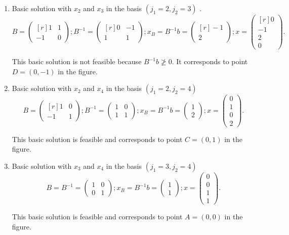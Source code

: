 \begin{enumerate}
This basic solution is feasible and corresponds to point $B=(1,0)$ .

\item Basic solution with $x_2$ and $x_3$ in the basis $(j_1=2,j_2=3)$ .
\[
B =
\begin{pmatrix*}[r]
1 & 1\\
-1 &0
\end{pmatrix*};
B^{-1} =
\begin{pmatrix*}[r]
0 & -1\\
1 & 1
\end{pmatrix*};
x_B = B^{-1}b =
\begin{pmatrix*}[r]
-1 \\
2
\end{pmatrix*};
x =
\begin{pmatrix*}[r]
0 \\
-1 \\
2 \\
0
\end{pmatrix*}.
\]

This basic solution is not feasible because $B^{-1}b\ngeqslant0$. It corresponds to point $D=(0,-1)$ in the figure.

\item Basic solution with $x_2$ and $x_4$ in the basis $(j_1=2,j_2=4)$
\[
B = 
\begin{pmatrix*}[r]
1 & 0\\
-1 &1
\end{pmatrix*};
B^{-1} =
\begin{pmatrix}
1 & 0\\
1 & 1
\end{pmatrix};
x_B = B^{-1}b =
\begin{pmatrix}
1 \\
2
\end{pmatrix};
x =
\begin{pmatrix}
0 \\
1 \\
0 \\
2
\end{pmatrix}.
\]

This basic solution is feasible and corresponds to point $C=(0,1)$ in the figure.

\item Basic solution with $x_3$ and $x_4$ in the basis $(j_1=3,j_2=4)$ 
\[
B = B^{-1} =
\begin{pmatrix}
1 & 0\\
0 & 1
\end{pmatrix};
x_B = B^{-1}b =
\begin{pmatrix}
1 \\
1
\end{pmatrix};
x =
\begin{pmatrix}
0 \\
0 \\
1 \\
1
\end{pmatrix}.
\]

This basic solution is feasible and corresponds to point $A=(0,0)$ in the figure.
\end{enumerate}

